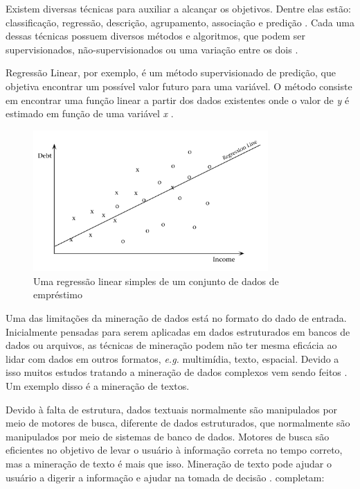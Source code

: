 Existem diversas técnicas para auxiliar a alcançar os objetivos. Dentre elas estão: classificação, regressão, descrição, agrupamento, associação e predição \cite{fayyad1996data}. Cada uma dessas técnicas possuem diversos métodos e algoritmos, que podem ser supervisionados, não-supervisionados ou uma variação entre os dois \cite{camilo2009mineraccao}.

Regressão Linear, por exemplo, é um método supervisionado de predição, que objetiva encontrar um possível valor futuro para uma variável. O método consiste em encontrar uma função linear a partir dos dados existentes onde o valor de \textit{y} é estimado em função de uma variável \textit{x} \cite{camilo2009mineraccao}.

\begin{figure}[h]
\centering
\includegraphics[width=0.8\textwidth]{img/linear-reg.png}
\caption{Uma regressão linear simples de um conjunto de dados de empréstimo \cite{fayyad1996data}}
\label{fig:linear-reg}
\end{figure}

Uma das limitações da mineração de dados está no formato do dado de entrada. Inicialmente pensadas para serem aplicadas em dados estruturados em bancos de dados ou arquivos, as técnicas de mineração podem não ter mesma eficácia ao lidar com dados em outros formatos, \textit{e.g.} multimídia, texto, espacial. Devido a isso muitos estudos tratando a mineração de dados complexos vem sendo feitos \cite{camilo2009mineraccao}. Um exemplo disso é a mineração de textos.

Devido à falta de estrutura, dados textuais normalmente são manipulados por meio de motores de busca, diferente de dados estruturados, que normalmente são manipulados por meio de sistemas de banco de dados. Motores de busca são eficientes no objetivo de levar o usuário à informação correta no tempo correto, mas a mineração de texto é mais que isso. Mineração de texto pode ajudar o usuário a digerir a informação e ajudar na tomada de decisão \cite{aggarwal2012mining}.  completam:

